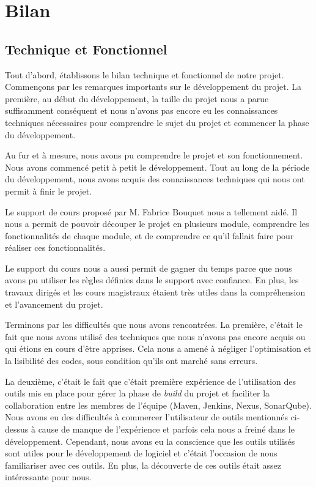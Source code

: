 \documentclass[a4paper,12pt]{report}
\begin{document}
\paragraph{}

\chapter{Bilan}
\section{Technique et Fonctionnel}
Tout d'abord, établissons le bilan technique et fonctionnel de notre projet. Commençons par les remarques importants sur le développement du projet. La première, au début du développement, la taille du projet nous a parue suffisamment conséquent et nous n'avons pas encore eu les connaissances techniques nécessaires pour comprendre le sujet du projet et commencer la phase du développement. 

Au fur et à mesure, nous avons pu comprendre le projet et son fonctionnement. Nous avons commencé petit à petit le développement. Tout au long de la période du développement, nous avons acquis des connaissances techniques qui nous ont permit à finir le projet.

Le support de cours proposé par M. Fabrice Bouquet nous a tellement aidé. Il nous a permit de pouvoir découper le projet en plusieurs module, comprendre les fonctionnalités de chaque module, et de comprendre ce qu'il fallait faire pour réaliser ces fonctionnalités.

Le support du cours nous a aussi permit de gagner du temps parce que nous avons pu utiliser les règles définies dans le support avec confiance. En plus, les travaux dirigés et les cours magistraux étaient très utiles dans la compréhension et l'avancement du projet.

Terminons par les difficultés que nous avons rencontrées. La première, c'était le fait que nous avons utilisé des techniques que nous n'avons pas encore acquis ou qui étions en cours d'être apprises. Cela nous a amené à négliger l'optimisation et la lisibilité des codes, sous condition qu'ils ont marché sans erreurs.

La deuxième, c'était le fait que c'était première expérience de l'utilisation des outils mis en place pour gérer la phase de \textit{build} du projet et faciliter la collaboration entre les membres de l'équipe (Maven, Jenkins, Nexus, SonarQube). Nous avons eu des difficultés à commercer l'utilisateur de outils mentionnés ci-dessus à cause de manque de l'expérience et parfois cela nous a freiné dans le développement. Cependant, nous avons eu la conscience que les outils utilisés sont utiles pour le développement de logiciel et c'était l'occasion de nous familiariser avec ces outils. En plus, la découverte de ces outils était assez intéressante pour nous. 
\end{document}
